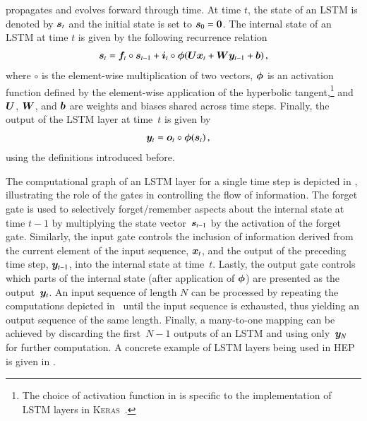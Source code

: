 propagates and evolves forward through time. At time $t$, the state of an LSTM
is denoted by $\bm{s}_{t}$ and the initial state is set to
$\bm{s}_{0} = \bm{0}$. The internal state of an LSTM at time $t$ is given
by the following recurrence relation~\cite{Goodfellow-et-al-2016,keras}
\begin{align}
  \bm{s}_{t} = \bm{f}_{t} \circ \bm{s}_{t - 1}
  + \bm{i}_{t} \circ \bm{\phi}(\bm{U} \bm{x}_{t} + \bm{W} \bm{y}_{t-1} + \bm{b}) \,\text{,}
  \label{eq:lstm_state_update}
\end{align}
where $\circ$ is the element-wise multiplication of two vectors, $\bm{\phi}$
is an activation function defined by the element-wise application of the
hyperbolic tangent,\footnote{The choice of activation function in
   is specific to the implementation of LSTM layers
  in \textsc{Keras}~\cite{keras}.} and $\bm{U}$, $\bm{W}$, and $\bm{b}$
are weights and biases shared across time steps. Finally, the output of the LSTM
layer at time~$t$ is given by~\cite{Goodfellow-et-al-2016}
\begin{align}
  &\bm{y}_{t} = \bm{o}_{t} \circ \bm{\phi}(\bm{s}_{t}) \,\text{,}
  \label{eq:lstm_output}
\end{align}
using the definitions introduced before.

The computational graph of an LSTM layer for a single time step is depicted in
, illustrating the role of the gates in controlling the flow of
information. The forget gate is used to selectively forget/remember aspects about
the internal state at time $t - 1$ by multiplying the state
vector~$\bm{s}_{t - 1}$ by the activation of the forget gate. Similarly, the
input gate controls the inclusion of information derived from the current
element of the input sequence, $\bm{x}_{t}$, and the output of the preceding
time step, $\bm{y}_{t - 1}$, into the internal state at time~$t$. Lastly, the
output gate controls which parts of the internal state (after application of
$\bm{\phi}$) are presented as the output~$\bm{y}_{t}$. An input sequence
of length $N$ can be processed by repeating the computations depicted
in~ until the input sequence is exhausted, thus yielding an
output sequence of the same length. Finally, a many-to-one mapping can be
achieved by discarding the first~$N - 1$ outputs of an LSTM and using
only~$\bm{y}_{N}$ for further computation. A concrete example of LSTM layers
being used in HEP is given in .


